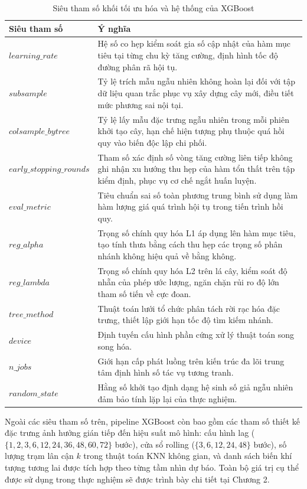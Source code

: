 \begin{table}[htbp]
\centering
\caption{Siêu tham số khối tối ưu hóa và hệ thống của XGBoost}
\label{tab:xgb_optim}
\renewcommand{\arraystretch}{1.3}
\begin{tabular}{p{4.2cm} p{10.2cm}}
\toprule
\textbf{Siêu tham số} & \textbf{Ý nghĩa} \\
\midrule
$learning\_rate$ & Hệ số co hẹp kiểm soát gia số cập nhật của hàm mục tiêu tại từng chu kỳ tăng cường, định hình tốc độ đường phân rã hội tụ. \\
$subsample$ & Tỷ lệ trích mẫu ngẫu nhiên không hoàn lại đối với tập dữ liệu quan trắc phục vụ xây dựng cây mới, điều tiết mức phương sai nội tại. \\
$colsample\_bytree$ & Tỷ lệ lấy mẫu đặc trưng ngẫu nhiên trong mỗi phiên khởi tạo cây, hạn chế hiện tượng phụ thuộc quá hồi quy vào biến độc lập chi phối. \\
$early\_stopping\_rounds$ & Tham số xác định số vòng tăng cường liên tiếp không ghi nhận xu hướng thu hẹp của hàm tổn thất trên tập kiểm định, phục vụ cơ chế ngắt huấn luyện. \\
$eval\_metric$ & Tiêu chuẩn sai số toàn phương trung bình sử dụng làm hàm lượng giá quá trình hội tụ trong tiến trình hồi quy. \\
$reg\_alpha$ & Trọng số chính quy hóa L1 áp dụng lên hàm mục tiêu, tạo tính thưa bằng cách thu hẹp các trọng số phân nhánh không hiệu quả về bằng không. \\
$reg\_lambda$ & Trọng số chính quy hóa L2 trên lá cây, kiểm soát độ nhẵn của phép ước lượng, ngăn chặn rủi ro độ lớn tham số tiến về cực đoan. \\
$tree\_method$ & Thuật toán lưới tổ chức phân tách rời rạc hóa đặc trưng, thiết lập giới hạn tốc độ tìm kiếm nhánh. \\
$device$ & Định tuyến cấu hình phần cứng xử lý thuật toán song song hóa. \\
$n\_jobs$ & Giới hạn cấp phát luồng trên kiến trúc đa lõi trung tâm định hình số tác vụ tương tranh. \\
$random\_state$ & Hằng số khởi tạo định dạng hệ sinh số giả ngẫu nhiên đảm bảo tính lặp lại của thực nghiệm. \\
\bottomrule
\end{tabular}
\end{table}

Ngoài các siêu tham số trên, pipeline XGBoost còn bao gồm các tham số thiết kế đặc trưng  ảnh hưởng gián tiếp đến hiệu suất mô hình: cấu hình lag ($\{1, 2, 3, 6, 12, 24, 36, 48, 60, 72\}$ bước), cửa sổ rolling ($\{3, 6, 12, 24, 48\}$ bước), số lượng trạm lân cận $k$ trong thuật toán KNN không gian, và danh sách biến khí tượng tương lai được tích hợp theo từng tầm nhìn dự báo. Toàn bộ giá trị cụ thể được sử dụng trong thực nghiệm sẽ được trình bày chi tiết tại Chương 2.



